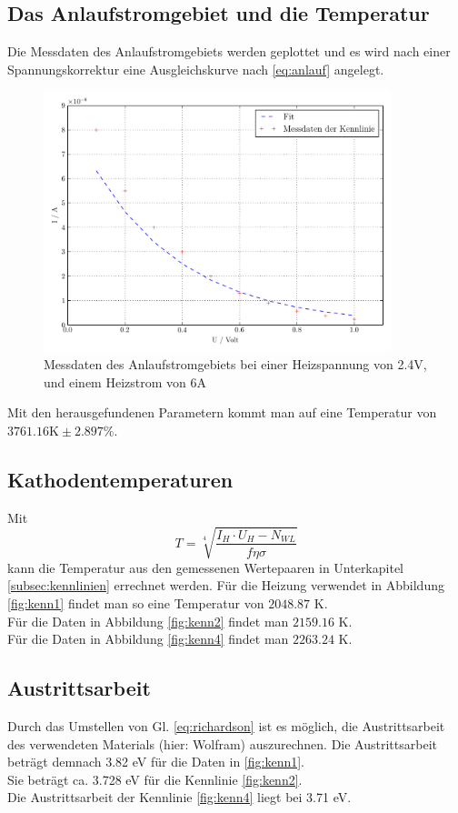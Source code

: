 \subsection{Das Anlaufstromgebiet und die Temperatur}
\label{subsec:c}
Die Messdaten des Anlaufstromgebiets werden geplottet und es wird nach einer Spannungskorrektur eine Ausgleichskurve nach \eqref{eq:anlauf} angelegt.
\begin{figure}[H]
  \centering
  \includegraphics[width=0.9\textwidth]{build/Kennlinie3.pdf}
  \caption{Messdaten des Anlaufstromgebiets bei einer Heizspannung von 2.4V, und einem Heizstrom von 6A \cite{sample}}
  \label{fig:kenn3}
\end{figure}
Mit den herausgefundenen Parametern kommt man auf eine Temperatur von
$3761.16 \mathrm{K} \pm 2.897 \%$.


\subsection{Kathodentemperaturen}
\label{subsec:d}
Mit 
\begin{equation}
T = \sqrt[4]{\frac{I_H \cdot U_H - N_{WL}}{f \eta \sigma}}
\label{eq:kenn1ergebnis}
\end{equation}
\cite{sample} kann die Temperatur aus den gemessenen Wertepaaren in Unterkapitel \ref{subsec:kennlinien} errechnet werden.
Für die Heizung verwendet in Abbildung \ref{fig:kenn1} findet man so eine Temperatur von
$2048.87$ K. \\
Für die Daten in Abbildung \ref{fig:kenn2} findet man
$2159.16$ K. \\
Für die Daten in Abbildung \ref{fig:kenn4} findet man
$2263.24$ K. \\

\subsection{Austrittsarbeit}
\label{subsec:e}
Durch das Umstellen von Gl. \eqref{eq:richardson} ist es möglich, die Austrittsarbeit des verwendeten Materials 
(hier: Wolfram) auszurechnen. 
Die Austrittsarbeit beträgt demnach 3.82 eV für die Daten in \ref{fig:kenn1}. \\
Sie beträgt ca. 3.728 eV für die Kennlinie \ref{fig:kenn2}. \\
Die Austrittsarbeit der Kennlinie \ref{fig:kenn4} liegt bei 3.71 eV. \\
